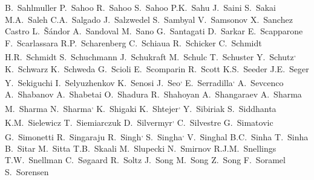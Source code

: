 \begin{flushleft}
B.~Sahlmuller\And
P.~Sahoo\And
R.~Sahoo\And
S.~Sahoo\And
P.K.~Sahu\And
J.~Saini\And
S.~Sakai\And
M.A.~Saleh\And
C.A.~Salgado\And
J.~Salzwedel\And
S.~Sambyal\And
V.~Samsonov\And
X.~Sanchez Castro\And
L.~\v{S}\'{a}ndor\And
A.~Sandoval\And
M.~Sano\And
G.~Santagati\And
D.~Sarkar\And
E.~Scapparone\And
F.~Scarlassara\And
R.P.~Scharenberg\And
C.~Schiaua\And
R.~Schicker\And
C.~Schmidt\And
H.R.~Schmidt\And
S.~Schuchmann\And
J.~Schukraft\And
M.~Schulc\And
T.~Schuster\And
Y.~Schutz\textsuperscript{,}\And
K.~Schwarz\And
K.~Schweda\And
G.~Scioli\And
E.~Scomparin\And
R.~Scott\And
K.S.~Seeder\And
J.E.~Seger\And
Y.~Sekiguchi\And
I.~Selyuzhenkov\And
K.~Senosi\And
J.~Seo\textsuperscript{,}\And
E.~Serradilla\textsuperscript{,}\And
A.~Sevcenco\And
A.~Shabanov\And
A.~Shabetai\And
O.~Shadura\And
R.~Shahoyan\And
A.~Shangaraev\And
A.~Sharma\And
M.~Sharma\And
N.~Sharma\textsuperscript{,}\And
K.~Shigaki\And
K.~Shtejer\textsuperscript{,}\And
Y.~Sibiriak\And
S.~Siddhanta\And
K.M.~Sielewicz\And
T.~Siemiarczuk\And
D.~Silvermyr\textsuperscript{,}\And
C.~Silvestre\And
G.~Simatovic\And
G.~Simonetti\And
R.~Singaraju\And
R.~Singh\textsuperscript{,}\And
S.~Singha\textsuperscript{,}\And
V.~Singhal\And
B.C.~Sinha\And
T.~Sinha\And
B.~Sitar\And
M.~Sitta\And
T.B.~Skaali\And
M.~Slupecki\And
N.~Smirnov\And
R.J.M.~Snellings\And
T.W.~Snellman\And
C.~S{\o}gaard\And
R.~Soltz\And
J.~Song\And
M.~Song\And
Z.~Song\And
F.~Soramel\And
S.~Sorensen\And

\end{flushleft}
